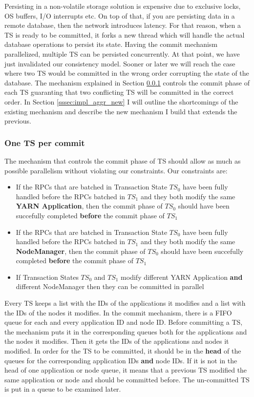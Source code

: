 Persisting in a non-volatile storage solution is expensive due to
exclusive locks, OS buffers, I/O interrupts etc. On top of that, if you are
persisting data in a remote database, then the network introduces
latency. For that reason, when a TS is ready to be committed, it forks
a new thread which will handle the actual database operations to
persist its state. Having the commit mechanism parallelized, multiple
TS can be persisted concurrently. At that point, we have just
invalidated our consistency model. Sooner or later we will
reach the case where two TS would be committed in the wrong order
corrupting the state of the database. The mechanism explained in
Section \ref{sssec:impl_aggr_old} controls the commit phase of each TS
guaranting that two conflicting TS will be committed in the correct
order. In Section \ref{sssec:impl_aggr_new} I will outline the
shortcomings of the existing mechanism and describe the new mechanism
I build that extends the previous.

\subsubsection{One TS per commit}
\label{sssec:impl_aggr_old}
The mechanism that controls the commit phase of TS should allow as
much as possible parallelism without violating our constraints. Our
constraints are:
\begin{itemize}
\item If the RPCs that are batched in Transaction State $TS_0$ have
  been fully handled before the RPCs batched in $TS_1$ and they both
  modify the same \textbf{YARN Application}, then the commit phase of $TS_0$
  should have been succefully completed \textbf{before} the commit
  phase of $TS_1$

\item If the RPCs that are batched in Transaction State $TS_0$ have
  been fully handled before the RPCs batched in $TS_1$ and they both
  modify the same \textbf{NodeManager}, then the commit phase of $TS_0$
  should have been succefully completed \textbf{before} the commit
  phase of $TS_1$

\item If Transaction States $TS_0$ and $TS_1$ modify different YARN
  Application \textbf{and} different NodeManager then they can be committed in parallel
\end{itemize}

Every TS keeps a list with the IDs of the applications it modifies and
a list with the IDs of the nodes it modifies. In the commit mechanism,
there is a FIFO queue for each and every application ID and node
ID. Before committing a TS, the mechanism puts it in the corresponding
queues both for the applications and the nodes it modifies. Then it
gets the IDs of the applications and nodes it modified. In order for
the TS to be committed, it should be in the \textbf{head} of the
queues for the corresponding application IDs \textbf{and} node IDs. If
it is not in the head of one application or node queue, it means that
a previous TS modified the same application or node and should be
committed before. The un-committed TS is put in a queue to be
examined later.

